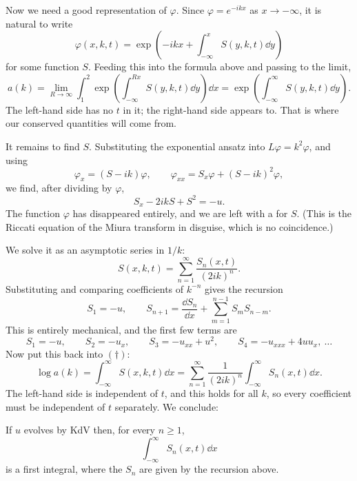 Now we need a good representation of $\varphi$. Since $\varphi = e^{-ikx}$ as $x\to-\infty$, it is natural to write
$$
\varphi(x,k,t) = \exp\left(-ikx + \int_{-\infty}^xS(y,k,t)\dd y\right)
$$
for some function $S$. Feeding this into the formula above and passing to the limit,
\begin{equation*}
a(k) = \lim_{R\to\infty}\int_1^2\exp\left(\int_{-\infty}^{Rx}S(y,k,t)\dd y\right)\dd x = \exp\left(\int_{-\infty}^\infty S(y,k,t)\dd y\right).\tag{$\dagger$}
\end{equation*}
The left-hand side has no $t$ in it; the right-hand side appears to. That is where our conserved quantities will come from.

It remains to find $S$. Substituting the exponential ansatz into $L\varphi = k^2\varphi$, and using
$$
\varphi_x = (S-ik)\varphi, \qquad \varphi_{xx} = S_x\varphi + (S-ik)^2\varphi,
$$
we find, after dividing by $\varphi$,
$$
S_x - 2ikS + S^2 = -u.
$$
The function $\varphi$ has disappeared entirely, and we are left with a  for $S$. (This is the Riccati equation of the Miura transform in disguise, which is no coincidence.)

We solve it as an asymptotic series in $1/k$:
$$
S(x,k,t) = \sum_{n=1}^\infty\frac{S_n(x,t)}{(2ik)^n}.
$$
Substituting and comparing coefficients of $k^{-n}$ gives the recursion
$$
S_1 = -u, \qquad S_{n+1} = \frac{\dd S_n}{\dd x} + \sum_{m=1}^{n-1}S_mS_{n-m}.
$$
This is entirely mechanical, and the first few terms are
$$
S_1 = -u, \qquad S_2 = -u_x, \qquad S_3 = -u_{xx} + u^2, \qquad S_4 = -u_{xxx} + 4uu_x, \ \dots
$$
Now put this back into $(\dagger)$:
$$
\log a(k) = \int_{-\infty}^\infty S(x,k,t)\dd x = \sum_{n=1}^\infty\frac{1}{(2ik)^n}\int_{-\infty}^\infty S_n(x,t)\dd x.
$$
The left-hand side is independent of $t$, and this holds for all $k$, so every coefficient must be independent of $t$ separately. We conclude:

\begin{theorem}
	If $u$ evolves by KdV then, for every $n\ge1$,
	$$
	\int_{-\infty}^\infty S_n(x,t)\dd x
	$$
	is a first integral, where the $S_n$ are given by the recursion above.
\end{theorem}


